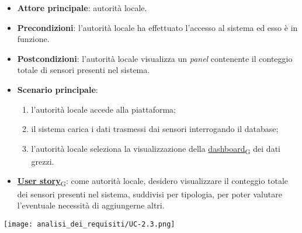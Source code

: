 \begin{itemize}
	\item \textbf{Attore principale}: autorità locale.
	\item \textbf{Precondizioni}: l'autorità locale ha effettuato l'accesso al sistema ed esso è in funzione.
	\item \textbf{Postcondizioni}: l'autorità locale visualizza un \textit{panel} contenente il conteggio totale di sensori presenti nel sistema.
	\item \textbf{Scenario principale}:
		\begin{enumerate}
			\item l'autorità locale accede alla piattaforma;
			\item il sistema carica i dati trasmessi dai sensori interrogando il database;
			\item l'autorità locale seleziona la visualizzazione della \href{https://7last.github.io/docs/rtb/documentazione-interna/glossario\#dashboard}{dashboard\textsubscript{G}} dei dati grezzi.
		\end{enumerate}
	\item \href{https://7last.github.io/docs/rtb/documentazione-interna/glossario\#user-story}{\textbf{User story}\textsubscript{G}}:
	      come autorità locale, desidero visualizzare il conteggio totale dei sensori presenti nel sistema, suddivisi per tipologia, per poter valutare l'eventuale necessità di aggiungerne altri.
\end{itemize}
\begin{center}
	\texttt{[image: analisi\_dei\_requisiti/UC-2.3.png]}
\end{center}
\newpage
{}
